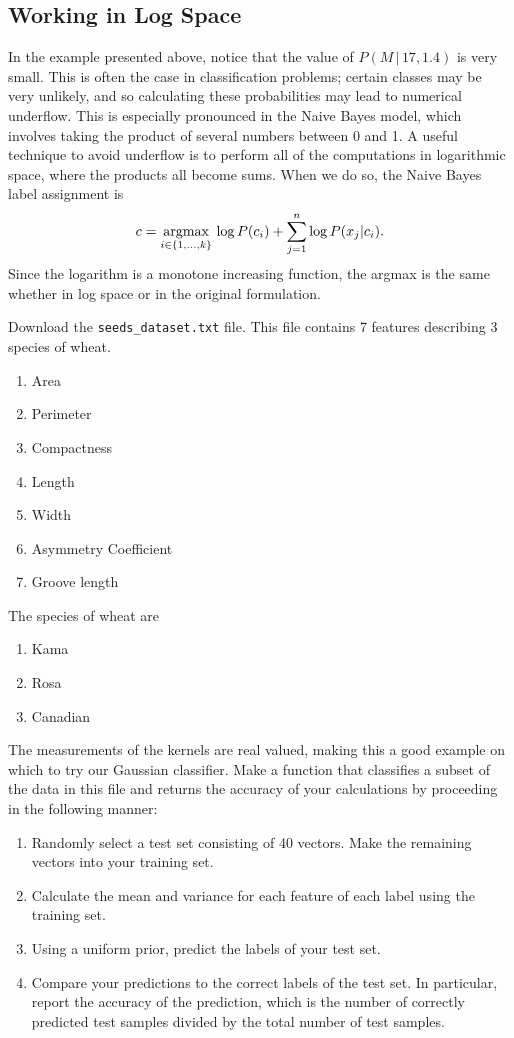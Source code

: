 \subsection*{Working in Log Space}
In the example presented above, notice that the value of $P(M\,|\,17,1.4)$ is very small.
This is often the case in classification problems; certain classes may be very unlikely, and so calculating these probabilities may lead to numerical underflow.
This is especially pronounced in the Naive Bayes model, which involves taking the product of several numbers between
0 and 1.
A useful technique to avoid underflow is to perform all of the computations in logarithmic space, where the products all become sums.
When we do so, the Naive Bayes label assignment is
\[
c = \underset{i \in \{1, \ldots, k\}}{\mbox{argmax}}\, \log P(c_i) + \sum_{j=1}^n \log P(x_j|c_i).
\]
Since the logarithm is a monotone increasing function, the argmax is the same whether in log space or
in the original formulation.

\begin{problem}
Download the {\tt seeds\_dataset.txt} file.
This file contains 7 features describing 3 species of wheat.
\begin{enumerate}
\item Area
\item Perimeter
\item Compactness
\item Length
\item Width
\item Asymmetry Coefficient
\item Groove length
\end{enumerate}

The species of wheat are
\begin{enumerate}
\item Kama
\item Rosa
\item Canadian
\end{enumerate}

The measurements of the kernels are real valued, making this a good example on which to try our Gaussian classifier.
Make a function that classifies a subset of the data in this file and returns the accuracy of your calculations by proceeding in the following manner:
\begin{enumerate}
\item Randomly select a test set consisting of 40 vectors.  Make the remaining vectors into your training set.
\item Calculate the mean and variance for each feature of each label using the training set.
\item Using a uniform prior, predict the labels of your test set.
\item Compare your predictions to the correct labels of the test set. In particular, report the accuracy of the prediction,
which is the number of correctly predicted test samples divided by the total number of test samples.
\end{enumerate}

\end{problem}

